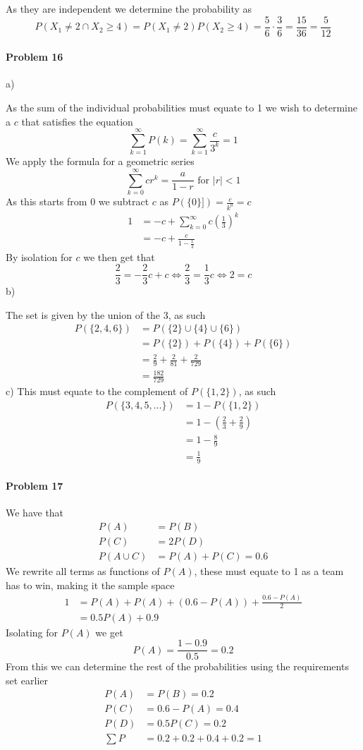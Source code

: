 As they are independent we determine the probability as
\[
    P(X_1\neq 2\cap X_2\geq 4)=P(X_1\neq 2)P(X_2\geq 4)=\frac{5}{6}\cdot\frac{3}{6}=\frac{15}{36}=\frac{5}{12}
\]
\paragraph{Problem 16}
a)

As the sum of the individual probabilities must equate to 1 we wish to determine a $c$ that satisfies the equation
\[
    \sum_{k=1}^{\infty}P(k)=\sum_{k=1}^{\infty}\frac{c}{3^{k}}=1
\]
We apply the formula for a geometric series
\[
    \sum_{k=0}^{\infty}cr^{k}=\frac{a}{1-r}\text{ for }|r|<1
\]
As this starts from $0$ we subtract $c$ as $P(\{0\}])=\frac{c}{k^{0}}=c$
\begin{align*}
    1&=-c+\sum_{k=0}^{\infty}c\left(\frac{1}{3}\right)^{k} \\
     &=-c+\frac{c}{1-\frac{1}{3}}
\end{align*}
By isolation for $c$ we then get that
\[
    \frac{2}{3}=-\frac{2}{3}c+c\Leftrightarrow \frac{2}{3}=\frac{1}{3}c\Leftrightarrow 2=c
\]
b)

The set is given by the union of the 3, as such
\begin{align*}
    P(\{2,4,6\})&=P(\{2\}\cup \{4\}\cup \{6\}) \\
              &=P(\{2\})+P(\{4\})+P(\{6\}) \\
              &=\frac{2}{9}+\frac{2}{81}+\frac{2}{729} \\
              &=\frac{182}{729}
\end{align*}
c) This must equate to the complement of $P(\{1,2\})$, as such
\begin{align*}
    P(\{3,4,5,\ldots\})&=1-P(\{1,2\}) \\
              &=1-\left(\frac{2}{3}+\frac{2}{9}\right) \\
              &=1-\frac{8}{9} \\
              &=\frac{1}{9}
\end{align*}
\paragraph{Problem 17}
We have that
\begin{align*}
    P(A)&=P(B) \\
    P(C)&=2P(D) \\
    P(A\cup C)&=P(A)+P(C)=0.6
\end{align*}
We rewrite all terms as functions of $P(A)$, these must equate to 1 as a team has to win, making it the sample space
\begin{align*}
    1&=P(A)+P(A)+(0.6-P(A))+\frac{0.6-P(A)}{2} \\
     &=0.5P(A)+0.9
\end{align*}
Isolating for $P(A)$ we get
\[
    P(A)=\frac{1-0.9}{0.5}=0.2
\]
From this we can determine the rest of the probabilities using the requirements set earlier
\begin{align*}
    P(A)&=P(B)=0.2 \\
    P(C)&=0.6-P(A)=0.4 \\
    P(D)&=0.5P(C)=0.2 \\
    \sum P&=0.2+0.2+0.4+0.2=1
\end{align*}
